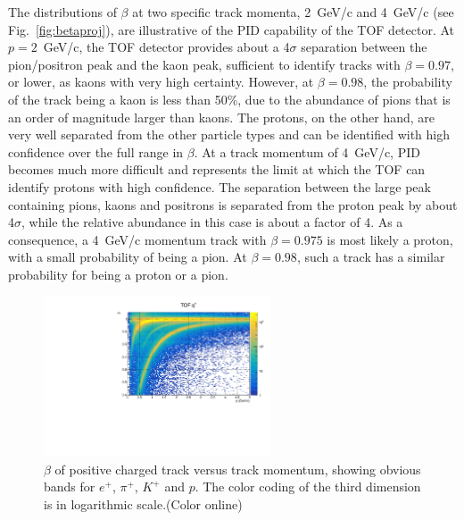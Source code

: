 The distributions of $\beta$ at two specific track momenta, 2~GeV/c and 4~GeV/c (see Fig.~\ref{fig:betaproj}), are illustrative of the PID capability of the TOF detector. At $p=2$~GeV/c, the TOF detector provides about a 4$\sigma$ separation between
the pion/positron peak and the kaon peak, sufficient to identify tracks with $\beta=0.97$, or lower, as kaons with very
high certainty. However, at  $\beta=0.98$, the probability of the track being a kaon is less than 50\%, due to the abundance of pions that is an order of magnitude larger than kaons. The protons, on the other hand, are very well
separated from the other particle types and can be identified with high confidence over the full range in $\beta$.
At a track momentum of 4~GeV/c, PID becomes much more difficult and represents the limit at which the TOF can identify protons with high confidence. The separation between the large peak containing pions, kaons and positrons is separated from the proton
peak by about 4$\sigma$, while the relative abundance in this case is about a factor of 4. As a consequence, a 4~GeV/c momentum
track with $\beta=0.975$ is most likely a proton, with a small probability of being a pion. At $\beta=0.98$, such
a track has a similar probability for being a proton or a pion.
\begin{figure}[tbp]
\begin{center}
\includegraphics[width=0.6\textwidth]{figures/beta_vs_p_positivetracks.pdf}
\caption{\label{fig:betavsp}$\beta$ of positive charged track versus track momentum, showing obvious bands for $e^+$, $\pi^+$, $K^+$ and $p$. The color coding of the third dimension
is in logarithmic scale.(Color online)}
\end{center}
\end{figure}

